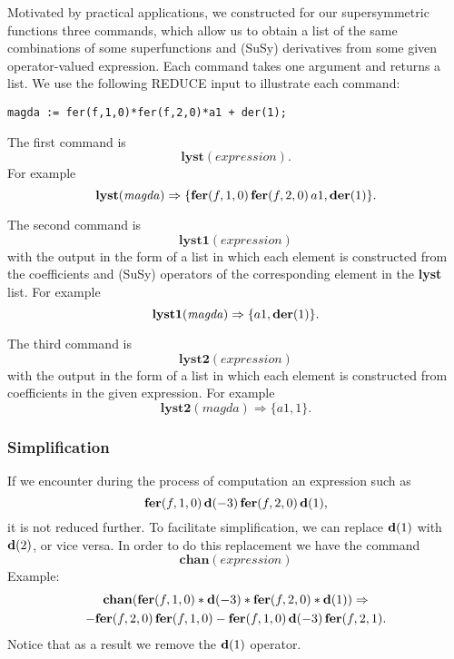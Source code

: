 {Motivated by practical applications, we constructed for our
supersymmetric functions three commands, which allow us to obtain a
list of the same combinations of some superfunctions and (SuSy)
derivatives from some given operator-valued expression.  Each command
takes one argument and returns a list.  We use the following REDUCE
input to illustrate each command:
\begin{verbatim}
magda := fer(f,1,0)*fer(f,2,0)*a1 + der(1);
\end{verbatim}

The first command is
\begin{equation*}
  \mathbf{lyst}(\mathit{expression}).
\end{equation*}
For example
\begin{equation*}
  \mathbf{lyst}(\mathit{magda}) \Rightarrow
  \{\mathbf{fer}(f,1,0)\,\mathbf{fer}(f,2,0)\,a1, \mathbf{der}(1)\}.
\end{equation*}

The second command is
\begin{equation*}
  \mathbf{lyst1}(\mathit{expression})
\end{equation*}
with the output in the form of a list in which each element is
constructed from the coefficients and (SuSy) operators of the
corresponding element in the \textbf{lyst} list.  For example
\begin{equation*}
  \mathbf{lyst1}(\mathit{magda}) \Rightarrow \{a1,\mathbf{der}(1)\}.
\end{equation*}

The third command is
\begin{equation*}
  \mathbf{lyst2}(\mathit{expression})
\end{equation*}
with the output in the form of a list in which each element is
constructed from coefficients in the given expression.  For example
\begin{equation*}
  \mathbf{lyst2}(\mathit{magda}) \Rightarrow \{a1,1\}.
\end{equation*}

\subsubsection*{Simplification}

If we encounter during the process of computation an expression such
as
\begin{equation*}
  \mathbf{fer}(f,1,0)\,\mathbf{d}(-3)\,\mathbf{fer}(f,2,0)\,\mathbf{d}(1),
\end{equation*}
it is not reduced further.  To facilitate simplification, we can
replace $\mathbf{d}(1)$ with $\mathbf{d}(2)$, or vice versa.  In order to do this
replacement we have the command
\begin{equation*}
  \mathbf{chan}(\mathit{expression})
\end{equation*}
Example:
\begin{multline*}
  \mathbf{chan}(\mathbf{fer}(f,1,0)*\mathbf{d}(-3)*\mathbf{fer}(f,2,0)*\mathbf{d}(1)) \Rightarrow \\
  -\mathbf{fer}(f,2,0)\,\mathbf{fer}(f,1,0) - \mathbf{fer}(f,1,0)\,\mathbf{d}(-3)\,\mathbf{fer}(f,2,1).
\end{multline*}
Notice that as a result we remove the $\mathbf{d}(1)$ operator.

}
